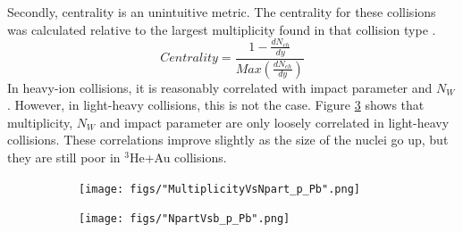 \documentclass[twocolumn,showpacs,amsfonts,aps,prc,nofootinbib,floatfix]{revtex4}
\begin{document}
Secondly, centrality is an unintuitive metric. The centrality for these collisions was calculated relative to the largest multiplicity found in that collision type \cite{Shen:2014vra}.
\begin{equation}
Centrality = \frac{1-\frac{dN_{ch}}{dy}}{Max(\frac{dN_{ch}}{dy})} 
\end{equation}
In heavy-ion collisions, it is reasonably correlated with impact parameter and $N_W$. However, in light-heavy collisions, this is not the case. Figure \ref{fig:MutliplcityNpartB} shows that multiplicity, $N_W$ and impact parameter are only loosely correlated in light-heavy collisions. These correlations improve slightly as the size of the nuclei go up, but they are still poor in $^3$He+Au collisions.
\begin{figure}
	\begin{subfigure}{0.4\linewidth}
		\texttt{[image: figs/"MultiplicityVsNpart\_p\_Pb".png]}
		\subcaption{}
		\label{subfig:MultVsNpart}
	\end{subfigure}
	\begin{subfigure}{0.4\linewidth}
		\texttt{[image: figs/"NpartVsb\_p\_Pb".png]}
		\subcaption{}
		\label{subfig:NpartVsb}
	\end{subfigure}
	
	\caption{}
	\label{fig:MutliplcityNpartB}
\end{figure}
\end{document}
